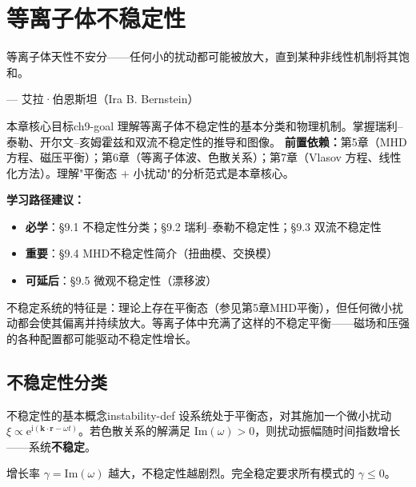 \documentclass[12pt,a4paper,openany,oneside]{book}
\newcommand{\ii}{\mathrm{i}}
\newcommand{\ee}{\mathrm{e}}
\newcommand{\vect}[1]{\bm{#1}}
\newcommand{\difficulty}[1]{\marginnote{\hfill\textcolor{coverMid!80}{\rule[-0.1em]{2pt}{0.9em}}\,\textcolor{coverMid}{\footnotesize\textbf{[#1]}}}}
\begin{document}



\chapter{等离子体不稳定性}\label{ch:9}
\epigraph{等离子体天性不安分——任何小的扰动都可能被放大，直到某种非线性机制将其饱和。}{--- 艾拉·伯恩斯坦（Ira B. Bernstein）}

\begin{insight}{本章核心目标}{ch9-goal}
理解等离子体不稳定性的基本分类和物理机制。掌握瑞利--泰勒、开尔文--亥姆霍兹和双流不稳定性的推导和图像。
\tcblower
\textbf{前置依赖：}第5章（MHD 方程、磁压平衡）；第6章（等离子体波、色散关系）；第7章（Vlasov 方程、线性化方法）。理解"平衡态 + 小扰动"的分析范式是本章核心。

\textbf{学习路径建议：}

\begin{itemize}[leftmargin=*]
\item[\textcolor{red}{$\blacksquare$}] \textbf{必学}：\S9.1 不稳定性分类；\S9.2 瑞利--泰勒不稳定性；\S9.3 双流不稳定性
\item[\textcolor{orange}{$\blacksquare$}] \textbf{重要}：\S9.4 MHD不稳定性简介（扭曲模、交换模）
\item[\textcolor{green}{$\blacksquare$}] \textbf{可延后}：\S9.5 微观不稳定性（漂移波）
\end{itemize}
\end{insight}

不稳定系统的特征是：理论上存在平衡态（参见第5章MHD平衡），但任何微小扰动都会使其偏离并持续放大。等离子体中充满了这样的不稳定平衡——磁场和压强的各种配置都可能驱动不稳定性增长。

\section{不稳定性分类}\difficulty{基础}

\begin{definition}{不稳定性的基本概念}{instability-def}
设系统处于平衡态，对其施加一个微小扰动 $\xi \propto \ee^{\ii(\vect{k}\cdot\vect{r}-\omega t)}$。若色散关系的解满足 $\text{Im}(\omega) > 0$，则扰动振幅随时间指数增长——系统\textbf{不稳定}。

增长率 $\gamma = \text{Im}(\omega)$ 越大，不稳定性越剧烈。完全稳定要求所有模式的 $\gamma \leq 0$。
\end{definition}
\end{document}
